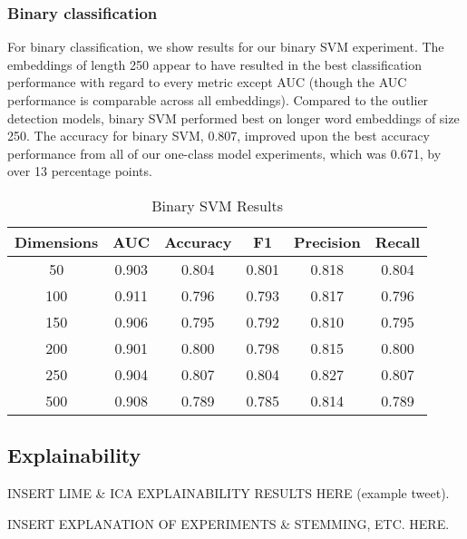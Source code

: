 \documentclass{article}
\begin{document}
\hypertarget{binary-classification}{%
\subsubsection{Binary classification}\label{binary-classification}}

For binary classification, we show results for our binary SVM
experiment. The embeddings of length 250 appear to have resulted in the
best classification performance with regard to every metric except AUC
(though the AUC performance is comparable across all embeddings).
Compared to the outlier detection models, binary SVM performed best on
longer word embeddings of size 250. The accuracy for binary SVM, 0.807,
improved upon the best accuracy performance from all of our one-class
model experiments, which was 0.671, by over 13 percentage points.

\begin{table}
 \caption{Binary SVM Results}
  \centering
  \begin{tabular}{|c|c|c|c|c|c|}
    \hline
    \rowcolor{lightgray} \textbf{Dimensions} & \textbf{AUC} & \textbf{Accuracy} & \textbf{F1} & \textbf{Precision} & \textbf{Recall} \\
    \hline
    50 & 0.903 & 0.804 & 0.801 & 0.818 & 0.804 \\
    \hline
    100 & \cellcolor{green} 0.911 & 0.796 & 0.793 & 0.817 & 0.796 \\
    \hline
    150 & 0.906 & 0.795 & 0.792 & 0.810 & 0.795 \\
    \hline
    200 & 0.901 & 0.800 & 0.798 & 0.815 & 0.800 \\
    \hline
    \cellcolor{green} 250 & 0.904 & \cellcolor{green} 0.807 & \cellcolor{green} 0.804 & \cellcolor{green} 0.827 & \cellcolor{green} 0.807 \\
    \hline
    500 & 0.908 & 0.789 & 0.785 & 0.814 & 0.789 \\
    \hline
  \end{tabular}
  \label{tab:svm}
\end{table}

\hypertarget{explainability}{%
\subsection{Explainability}\label{explainability}}

INSERT LIME \& ICA EXPLAINABILITY RESULTS HERE (example tweet).

INSERT EXPLANATION OF EXPERIMENTS \& STEMMING, ETC. HERE.
\end{document}
